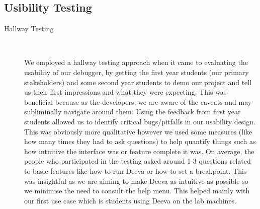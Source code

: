 \documentclass[11pt, a4paper]{article}
\begin{document}
\subsection{Usibility Testing}
\begin{description}
\item[Hallway Testing] \hfill \\
\begin{figure}[h!]
\centering
{}
\quad
{}
\end{figure}

We employed a hallway testing approach when it came to evaluating the usability of our debugger, by getting the first year students (our primary stakeholders) and some second year students to demo our project and tell us their first impressions and what they were expecting. This was beneficial because as the developers, we are aware of the caveats and may subliminally navigate around them.
Using the feedback from first year students allowed us to identify critical bugs/pitfalls in our usability design.
This was obviously more qualitative however we used some measures (like how many times they had to ask questions) to help quantify things such as how intuitive the interface was or feature complete it was.
On average, the people who participated in the testing asked around 1-3 questions related to basic features like how to run Deeva or how to set a breakpoint.
This was insightful as we are aiming to make Deeva as intuitive as possible so we minimise the need to consult the help menu.
This helped mainly with our first use case which is students using Deeva on the lab machines.


\end{description}
\end{document}
